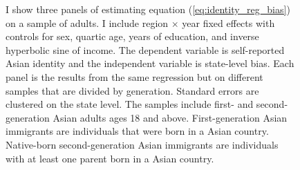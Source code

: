 \begin{center}
\begin{figure}[!htb]
\caption*{\footnotesize{I show three panels of estimating equation (\ref{eq:identity_reg_bias}) on a sample of adults. I include region $\times$ year fixed effects with controls for sex, quartic age, years of education, and inverse hyperbolic sine of income. The dependent variable is self-reported Asian identity and the independent variable is state-level bias. Each panel is the results from the same regression but on different samples that are divided by generation. Standard errors are clustered on the state level. The samples include first- and second-generation Asian adults ages 18 and above. First-generation Asian immigrants are individuals that were born in a Asian country. Native-born second-generation Asian immigrants are individuals with at least one parent born in a Asian country.}}
\end{figure}
\end{center}

\pagebreak
\newpage


